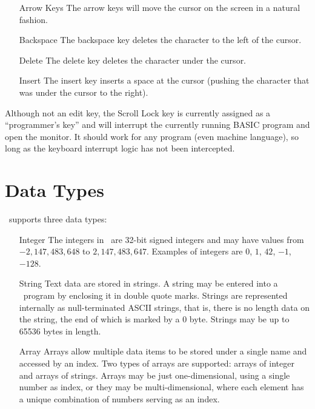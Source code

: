 \documentclass{report}
\begin{document}
    \begin{itemize}
        \item[Arrow Keys] The arrow keys will move the cursor on the screen in a natural fashion.
        \item[Backspace] The backspace key deletes the character to the left of the cursor.
        \item[Delete] The delete key deletes the character under the cursor.
        \item[Insert] The insert key inserts a space at the cursor (pushing the character that was under the cursor to the right).    
    \end{itemize}

    Although not an edit key, the Scroll Lock key is currently assigned as a ``programmer's key'' and will interrupt
    the currently running BASIC program and open the monitor. It should work for any program (even machine language), so
    long as the keyboard interrupt logic has not been intercepted.

    \section*{Data Types}

    \BASIC\ supports three data types:

    \begin{itemize}
        \item[Integer]  The integers in \BASIC\ are 32-bit signed integers and may have values from $-2,147,483,648$ to $2,147,483,647$.
                        Examples of integers are $0$, $1$, $42$, $-1$, $-128$.

        \item[String]   Text data are stored in strings. A string may be entered into a \BASIC\ program by enclosing it in double quote marks.
                        Strings are represented internally as null-terminated ASCII strings, that is, there is no length data on the string,
                        the end of which is marked by a 0 byte.
                        Strings may be up to 65536 bytes in length.
                        
        \item[Array]    Arrays allow multiple data items to be stored under a single name and accessed by an index.
                        Two types of arrays are supported: arrays of integer and arrays of strings.
                        Arrays may be just one-dimensional, using a single number as index, or they may be multi-dimensional,
                        where each element has a unique combination of numbers serving as an index.
    \end{itemize}
\end{document}
